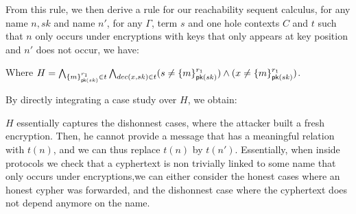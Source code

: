   From this rule, we then derive a rule for our reachability sequent calculus, for any name $n,sk$ and name $n'$, for any $\Gamma$, term $s$ and one hole contexts $C$ and $t$ such that $n$ only occurs under encryptions with keys that only appears at key position and $n'$ does not occur, we have:


  \begin{mathpar}
  \end{mathpar}

  Where $H  =       \bigwedge_{\myenc{m}{r_1}{sk} \in t}  \bigwedge_{dec(x,sk) \in t} (s \not = \myenc{m}{r_1}{sk}) \wedge  (x \not = \myenc{m}{r_1}{sk})$.

  By directly integrating a case study over $H$, we obtain:

  \begin{mathpar}
  \end{mathpar}

$H$ essentially captures the dishonnest cases, where the attacker built a fresh encryption. Then, he cannot provide a message that has a meaningful relation with $t(n)$, and we can thus replace $t(n)$ by $t(n')$. Essentially, when inside protocols we check that a cyphertext is non trivially linked to some name that only occurs under encryptions,we can either consider the honest cases where an honest cypher was forwarded, and the dishonnest case where the cyphertext does not depend anymore on the name.

